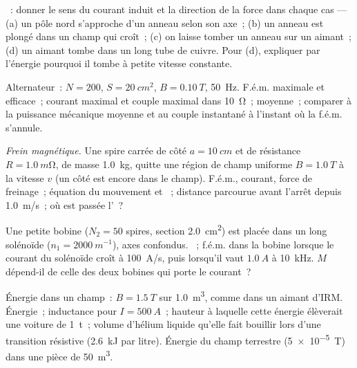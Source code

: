 \begin{exercise}[$\star\star$]\label{exo:b1:induction:5}
~: donner le sens du courant induit et la direction de la force dans
chaque cas --- (a) un pôle nord s'approche d'un anneau selon son axe~; (b) un
anneau est plongé dans un champ qui croît~; (c) on laisse tomber un anneau sur
un aimant~; (d) un aimant tombe dans un long tube de cuivre. Pour (d),
expliquer par l'énergie pourquoi il tombe à petite vitesse constante.
\end{exercise}

\begin{exercise}[$\star\star$]\label{exo:b1:induction:6}
Alternateur~: $N = 200$, $S = \qty{20}{cm^2}$, $B = \qty{0.10}{T}$, \qty{50}{Hz}.
F.é.m. maximale et efficace~; courant maximal et couple maximal dans
\qty{10}{\ohm}~;  moyenne~; comparer à la puissance
mécanique moyenne et au couple instantané à l'instant où la f.é.m. s'annule.
\end{exercise}

\begin{exercise}[$\star\star$]\label{exo:b1:induction:7}
\emph{Frein magnétique.} Une spire carrée de côté $a = \qty{10}{cm}$ et de
résistance $R = \qty{1.0}{m\ohm}$, de masse \qty{1.0}{kg}, quitte une région de
champ uniforme $B = \qty{1.0}{T}$ à la vitesse $v$ (un côté est encore dans le
champ). F.é.m., courant, force de freinage~; équation du mouvement et ~; distance parcourue avant l'arrêt depuis \qty{1.0}{m/s}~; où est
passée l'~?
\end{exercise}

\begin{exercise}[$\star\star$]\label{exo:b1:induction:8}
Une petite bobine ($N_2 = 50$ spires, section \qty{2.0}{cm^2}) est placée dans
un long solénoïde ($n_1 = \qty{2000}{m^{-1}}$), axes confondus. ~; f.é.m. dans la bobine lorsque le courant du solénoïde croît à
\qty{100}{A/s}, puis lorsqu'il vaut $\qty{1.0}{A}$ à \qty{10}{kHz}. $M$
dépend-il de celle des deux bobines qui porte le courant~?
\end{exercise}

\begin{exercise}[$\star\star$]\label{exo:b1:induction:9}
Énergie dans un champ~: $B = \qty{1.5}{T}$ sur \qty{1.0}{m^3}, comme dans un
aimant d'IRM. Énergie~; inductance pour $I = \qty{500}{A}$~; hauteur à laquelle
cette énergie élèverait une voiture de \qty{1}{t}~; volume d'hélium liquide
qu'elle fait bouillir lors d'une transition résistive (\qty{2.6}{kJ} par litre).
Énergie du champ terrestre (\qty{5e-5}{T}) dans une pièce de \qty{50}{m^3}.
\end{exercise}


